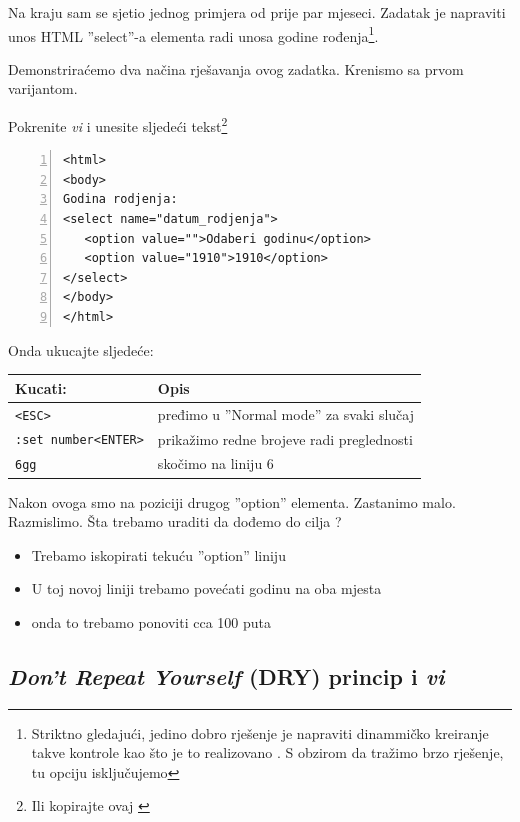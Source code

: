 \documentclass[times, utf8, seminar]{fit}
\begin{document}
Na kraju sam se sjetio jednog primjera od prije par mjeseci. Zadatak je napraviti unos HTML ''select''-a elementa radi unosa godine rođenja\footnote{Striktno gledajući, jedino dobro rješenje je napraviti dinammičko kreiranje takve kontrole kao što je to realizovano \href{https://github.com/hernad/FIT\_WT/blob/master/09\_2012/util.js\#L9}{\color{blue}{ovdje}}. S obzirom da tražimo brzo rješenje, tu opciju isključujemo}.

Demonstriraćemo dva načina rješavanja ovog zadatka. Krenismo sa prvom varijantom.

Pokrenite \emph{vi} i unesite sljedeći tekst\footnote{Ili kopirajte ovaj \href{https://gist.github.com/raw/4412263/1e751a7305ab75823689cfb7654304337f75336e/gistfile1.txt}{\color{blue}{gist}}}
\begin{lstlisting}[numbers=left]
<html>
<body>
Godina rodjenja:
<select name="datum_rodjenja">
   <option value="">Odaberi godinu</option>
   <option value="1910">1910</option>
</select>
</body>
</html>
\end{lstlisting}

Onda ukucajte sljedeće:

\begin{center}
\begin{tabular}{ l | l }
  \hline                        
   Kucati:    &  Opis \\ 
   \hline
   \verb+<ESC>+     & pređimo u ''Normal mode'' za svaki slučaj \\
   \verb+:set number<ENTER>+ &  prikažimo redne brojeve radi preglednosti \\
   \verb+6gg+    & skočimo na liniju 6 \\
   \hline
\end{tabular}
\end{center}

Nakon ovoga smo na poziciji drugog ''option'' elementa. Zastanimo malo. Razmislimo. Šta trebamo uraditi da dođemo do cilja ? 
\begin{itemize}
  \item Trebamo iskopirati tekuću ''option'' liniju
  \item U toj novoj liniji trebamo povećati godinu na oba mjesta
  \item onda to trebamo ponoviti cca 100 puta
\end{itemize}

\subsection{\emph{Don't Repeat Yourself} (DRY) princip i \emph{vi}}
 
\end{document}
